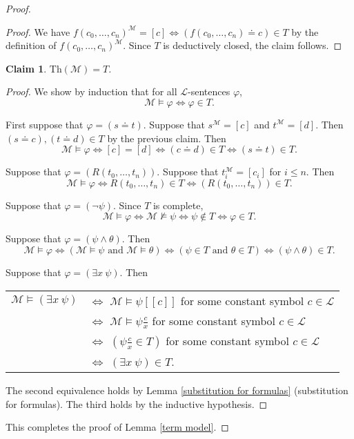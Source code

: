 \documentclass[a4paper, 11pt]{amsart}
\newtheorem*{claim*}{Claim}
\theoremstyle{remark}
\newcommand{\Th}{\mathrm{Th}}
\newcommand{\cL}{\mathcal L}
\newcommand{\cM}{\mathcal M}
\begin{document}
\begin{proof}
\begin{proof}
We have $f(c_0,\dots,c_n)^\cM = [c] \Longleftrightarrow (f(c_0,\dots,c_n)\doteq c) \in T $ by the definition of $f(c_0,\dots,c_n)^\cM $. 
Since $T$ is deductively closed, the claim follows. 
\end{proof} 



\begin{claim*}
$\Th(\cM)=T$. 
\end{claim*} 
\begin{proof} 
We show by induction that for all $\cL$-sentences $\varphi$, 
$$ \cM \models \varphi  \Longleftrightarrow  \varphi\in T .$$ 

First suppose that $\varphi = ( s\doteq t)$. 
Suppose that $s^\cM = [c]$ and $t^\cM = [d]$. 
Then $(s\doteq c), (t\doteq d) \in T$ by the previous claim. 
Then 
$$\cM\models \varphi \Leftrightarrow [c] = [d] \Leftrightarrow (c\doteq d)\in T \Leftrightarrow (s\doteq t)\in T.$$ 

Suppose that $\varphi=  (R(t_0, \dots, t_n) ) $. 
Suppose that $t_i^\cM = [c_i]$ for $i\leq n$. 
Then 
$$\cM\models \varphi \Leftrightarrow R(t_0, \dots, t_n) \in T \Leftrightarrow (R(t_0, \dots, t_n))\in T.$$ 

Suppose that $\varphi=  (\neg \psi)$. 
Since $T$ is complete, 
$$\cM\models \varphi \Leftrightarrow \cM \not\models \psi \Leftrightarrow \psi \notin T \Leftrightarrow \varphi \in T.$$ 

Suppose that $\varphi=  (\psi \wedge \theta )$. 
Then 
$$\cM\models \varphi \Leftrightarrow (\cM \models \psi \text{ and } \cM \models \theta)  \Leftrightarrow (\psi \in T \text{ and } \theta\in T) \Leftrightarrow (\psi \wedge \theta) \in T.$$ 

Suppose that $\varphi=  (\exists x\ \psi )$. 
Then 

\smallskip 
\begin{tabular}{ll} 
$\cM \models (\exists x\ \psi)$ & $\Longleftrightarrow$ $\cM \models \psi[ [c] ]$ for some constant symbol $c\in \cL$ \\ 
& $\Longleftrightarrow$ $\cM \models \psi\frac{c}{x}$ for some constant symbol $c\in \cL$ \\ 
& $\Longleftrightarrow$ $(\psi\frac{c}{x} \in T)$ for some constant symbol $c\in \cL$ \\ 
& $\Longleftrightarrow$ $(\exists x\ \psi) \in T.$
\end{tabular} 

The second equivalence holds by Lemma \ref{substitution for formulas} (substitution for formulas). 
The third holds by the inductive hypothesis. 
\end{proof} 
This completes the proof of Lemma \ref{term model}. 
\end{proof} 
\end{document}
